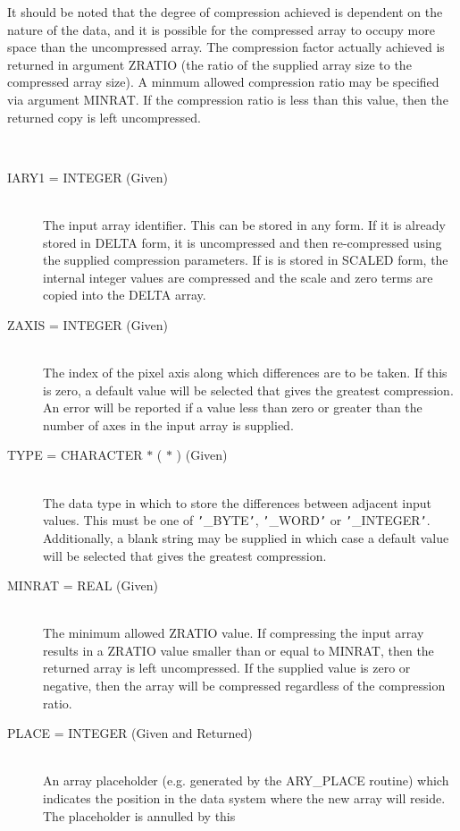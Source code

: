 \documentclass[twoside,11pt]{article}
\newcommand{\sstinvocation}[1]{\item[Invocation:]\hspace{0.4em}{\tt #1}}
\newcommand{\sstarguments}[1]{
   \item[Arguments:] \mbox{} \\
   \vspace{-3.5ex}
   \begin{description}
      #1
   \end{description}
}
\newcommand{\sstsubsection}[1]{ \item[{#1}] \mbox{} \\}
\newcommand{\ssttt}{\tt}
\newcommand{\sstinvocation}[1]{\item[Invocation:]
      \begin{description}
         {\ssttt #1}
      \end{description}
   }
\newcommand{\sstarguments}[1]{
      \item[Arguments:]
      \begin{description}
         #1
      \end{description}
   }
\newcommand{\sstsubsection}[1]{\item[{#1}]}
\begin{document}
{{      It should be noted that the degree of compression achieved is
      dependent on the nature of the data, and it is possible for the
      compressed array to occupy more space than the uncompressed array.
      The compression factor actually achieved is returned in argument
      ZRATIO (the ratio of the supplied array size to the compressed
      array size). A minmum allowed compression ratio may be specified via
      argument MINRAT. If the compression ratio is less than this value,
      then the returned copy is left uncompressed.
   }
   \sstinvocation{
      CALL ARY\_DELTA( IARY1, ZAXIS, TYPE, MINRAT, PLACE, ZRATIO, IARY2,
                      STATUS )
   }
   \sstarguments{
      \sstsubsection{
         IARY1 = INTEGER (Given)
      }{
         The input array identifier. This can be stored in any form. If
         it is already stored in DELTA form, it is uncompressed and then
         re-compressed using the supplied compression parameters. If
         is is stored in SCALED form, the internal integer values are
         compressed and the scale and zero terms are copied into the
         DELTA array.
      }
      \sstsubsection{
         ZAXIS = INTEGER (Given)
      }{
         The index of the pixel axis along which differences are to be
         taken. If this is zero, a default value will be selected that
         gives the greatest compression. An error will be reported if a
         value less than zero or greater than the number of axes in the
         input array is supplied.
      }
      \sstsubsection{
         TYPE = CHARACTER $*$ ( $*$ ) (Given)
      }{
         The data type in which to store the differences between adjacent
         input values. This must be one of {\tt '}\_BYTE{\tt '}, {\tt '}\_WORD{\tt '} or
         {\tt '}\_INTEGER{\tt '}. Additionally, a blank string may be supplied in which
         case a default value will be selected that gives the greatest
         compression.
      }
      \sstsubsection{
         MINRAT = REAL (Given)
      }{
         The minimum allowed ZRATIO value. If compressing the input array
         results in a ZRATIO value smaller than or equal to MINRAT, then
         the returned array is left uncompressed. If the supplied value is
         zero or negative, then the array will be compressed regardless of
         the compression ratio.
      }
      \sstsubsection{
         PLACE = INTEGER (Given and Returned)
      }{
         An array placeholder (e.g. generated by the ARY\_PLACE routine)
         which indicates the position in the data system where the new
         array will reside. The placeholder is annulled by this
}}}
\end{document}
